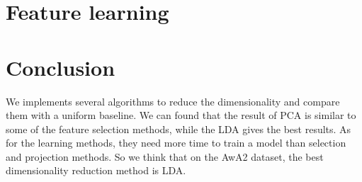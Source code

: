 \documentclass{article}
\begin{document}
\section{Feature learning}
\label{sec:learning}

\section{Conclusion}
We implements several algorithms to reduce the dimensionality and compare them with a uniform baseline. We can found that the result of PCA is similar to some of the feature selection methods, while the LDA gives the best results. As for the learning methods, they need more time to train a model than selection and projection methods. So we think that on the AwA2 dataset, the best dimensionality reduction method is LDA.

  

\end{document}
